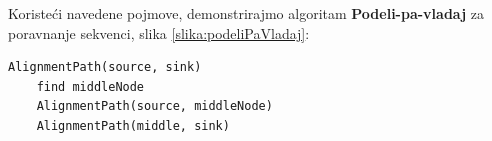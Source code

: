 Koristeći navedene pojmove, demonstrirajmo algoritam \textbf{Podeli-pa-vladaj} za poravnanje sekvenci, slika \ref{slika:podeliPaVladaj}: \\

\begin{lstlisting}
AlignmentPath(source, sink)
    find middleNode
    AlignmentPath(source, middleNode)
    AlignmentPath(middle, sink)
\end{lstlisting}

